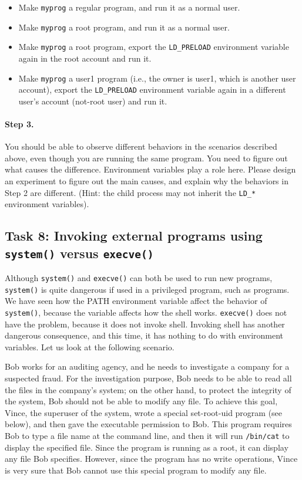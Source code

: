   \begin{itemize}
  \item Make {\tt myprog} a regular program, and run it as a normal user.
  \item Make {\tt myprog} a \setuid root program, and run it as a normal user.
  \item Make {\tt myprog} a \setuid root program, export the {\tt LD\_PRELOAD}
  environment variable again in the root account and run it. 

  \item Make {\tt myprog} a \setuid user1 program (i.e., the owner is user1, which 
        is another user account), export the {\tt LD\_PRELOAD} environment variable 
	again in a different user's account (not-root user) and run it.
  \end{itemize}


\paragraph{Step 3.} 
You should be able to observe different behaviors in the scenarios
described above, even though you are running the same program.  You need 
to figure out what causes the difference. Environment variables 
play a role here. Please design an experiment to figure out the 
main causes, and explain why the behaviors in Step 2 are 
different. (Hint: the child process 
may not inherit the {\tt LD\_*} environment variables). 



\subsection{Task 8: Invoking external programs using {\tt system()} versus {\tt execve()}}

Although {\tt system()} and {\tt execve()} can both be used to run new
programs, {\tt system()} is quite dangerous if used in a privileged
program, such as \setuid programs. We have seen how the PATH environment
variable affect the behavior of {\tt system()}, because the variable
affects how the shell works. {\tt execve()} does not have the problem,
because it does not invoke shell. Invoking shell has another dangerous 
consequence, and this time, it has nothing to do with environment
variables.  Let us look at the following scenario.


Bob works for an auditing agency, and he needs to investigate a company for a suspected
fraud. For the investigation purpose, Bob needs to be able to read 
all the files in the 
company's \unix system; on the other hand, to protect the integrity of the system,
Bob should not be able to modify any file. 
To achieve this goal, Vince, the superuser of the system, 
wrote a special set-root-uid program (see
below), and then gave the executable permission to Bob. This program requires
Bob to type a file name at the command line, and then it will 
run {\tt /bin/cat} to display the specified file. Since the program is running
as a root, it can display any file Bob specifies. However, since the program
has no write operations, Vince is very sure that Bob cannot use this special program 
to modify any file.

